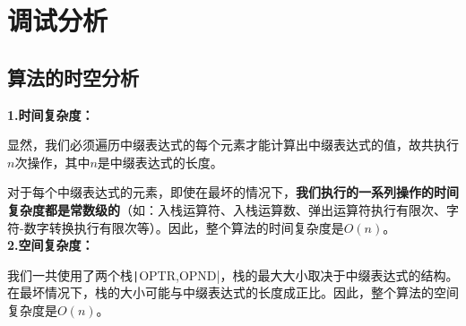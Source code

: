 \documentclass[10pt,a4paper]{article}
\begin{document}
	\newpage
	\section{调试分析}
	\subsection{算法的时空分析}
	\noindent \textbf{1.时间复杂度：}
	
	显然，我们必须遍历中缀表达式的每个元素才能计算出中缀表达式的值，故共执行$n$次操作，其中$n$是中缀表达式的长度。
	
	对于每个中缀表达式的元素，即使在最坏的情况下，\textbf{我们执行的一系列操作的时间复杂度都是常数级的}（如：入栈运算符、入栈运算数、弹出运算符执行有限次、字符-数字转换执行有限次等）。因此，整个算法的时间复杂度是$O(n)$。\\
	
	\noindent \textbf{2.空间复杂度：}
	
	我们一共使用了两个栈\texttt|OPTR,OPND|，栈的最大大小取决于中缀表达式的结构。在最坏情况下，栈的大小可能与中缀表达式的长度成正比。因此，整个算法的空间复杂度是$O(n)$。
	
	\newpage
\end{document}

